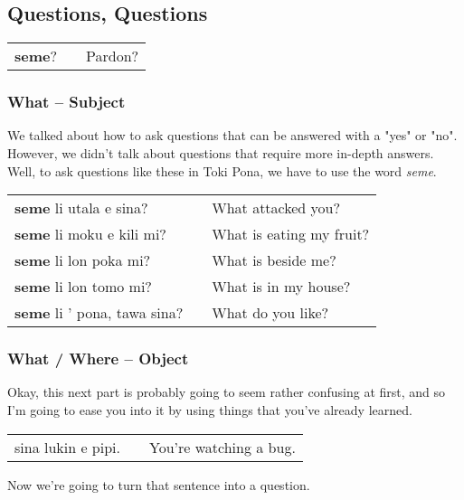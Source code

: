\subsection*{Questions, Questions}
%
\begin{supertabular}{p{5,5cm}|ll}
\textbf{seme}? && Pardon? \\
\end{supertabular} 
%
\subsubsection*{What -- Subject}
%
We talked about how to ask questions that can be answered with a "yes" or "no". 
However, we didn't talk about questions that require more in-depth answers. 
Well, to ask questions like these in Toki Pona, we have to use the word \textit{seme}. 

\begin{supertabular}{p{5,5cm}|ll}
\textbf{seme} li utala e sina? && What attacked you? \\
\textbf{seme} li moku e kili mi? && What is eating my fruit? \\
\textbf{seme} li lon poka mi? && What is beside me? \\
\textbf{seme} li lon tomo mi? && What is in my house? \\
\textbf{seme} li ' pona, tawa sina? && What do you like? \\ 
\end{supertabular} 
%
\subsubsection*{What / Where -- Object}
%
Okay, this next part is probably going to seem rather confusing at first, and so I'm going to ease you into it by using things that you've already learned. 

\begin{supertabular}{p{5,5cm}|ll}
sina lukin e pipi. && You're watching a bug. \\
\end{supertabular} 

Now we're going to turn that sentence into a question. 

